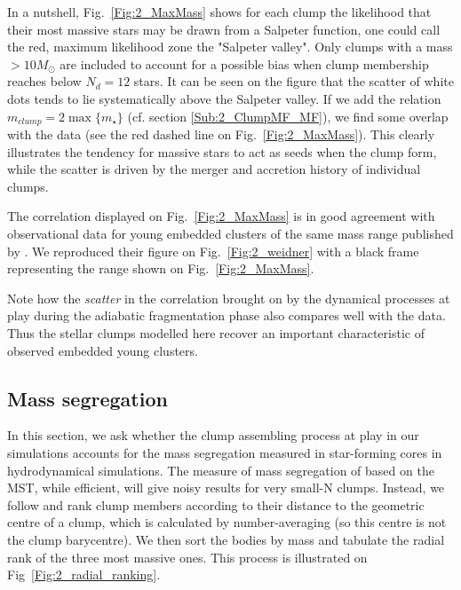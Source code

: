  In a nutshell, Fig.~\ref{Fig:2_MaxMass} shows for each clump the likelihood that their most massive stars may be drawn from a Salpeter function, one could call the red, maximum likelihood zone the "Salpeter valley". Only clumps with a mass $> 10 M_\odot$ are included to account for a possible bias when clump membership reaches below $N_d =12 $ stars. It can be seen on the figure that the scatter of white dots tends to lie systematically above the Salpeter valley. If we add the  relation $m_{clump} = 2\max\{m_\star\}$ (cf. section \ref{Sub:2_ClumpMF_MF}), we find some overlap with the data (see the red dashed line on Fig.~\ref{Fig:2_MaxMass}). This clearly illustrates the tendency for massive stars to act as seeds when the clump form, while the scatter is driven by the merger and accretion history of individual clumps. 
 
 The correlation displayed on Fig.~\ref{Fig:2_MaxMass} is in good agreement with observational data for young embedded clusters of the same mass range published by \citealt{Weidner2013}. We reproduced their figure on Fig.~\ref{Fig:2_weidner} with a black frame representing the range shown on Fig.~\ref{Fig:2_MaxMass}. 
 
 Note how the {\it scatter} in the correlation brought on by the dynamical processes at play during the adiabatic fragmentation phase also compares well with the data. Thus the stellar clumps modelled here recover an important characteristic of observed embedded young clusters.
 





\subsection{Mass segregation}
\label{Sec:2_ClumpSegregation}

In this section, we ask whether the clump assembling process at play in our simulations accounts for the mass segregation measured  in  star-forming cores in hydrodynamical simulations. The measure of mass segregation of \cite{Olczak2011} based on the MST, while efficient, will give noisy results for very small-N clumps. Instead, we follow \cite{Maschberger2010} and rank clump members according to their distance to the geometric centre of a clump, which is calculated by number-averaging (so this centre is not the clump barycentre). We then sort the bodies by mass and tabulate the radial rank of the three most massive ones. This process is illustrated on Fig~\ref{Fig:2_radial_ranking}.


